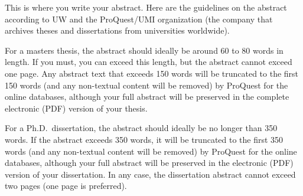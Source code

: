\documentclass[12pt]{book}                  %
\begin{document}

\thesisCommitteePage

\begin{thesisabstract}
This is where you write your abstract.  Here are the guidelines on
the abstract according to UW and the
ProQuest/UMI organization (the company that archives theses and dissertations from
universities worldwide).


For a masters thesis, the abstract should ideally be around 60 to 80
words in length.  If you must, you can exceed this length, but the
abstract cannot exceed one page.  Any abstract text that exceeds
150 words will be truncated to the first 150 words (and any non-textual content will
be removed) by ProQuest for the online databases, although your full abstract will
be preserved in the complete electronic (PDF) version of your thesis.


For a Ph.D.\ dissertation, the abstract should ideally be no longer than 350 words. If
the abstract exceeds 350 words, it will be truncated to the first 350 words (and any
non-textual content will be removed) by ProQuest for the online databases, although your
full abstract will be preserved in the electronic (PDF) version of your dissertation. In
any case, the dissertation abstract cannot exceed two pages (one page is preferred).



\end{thesisabstract}

 \thesistitlepage        %
 \thesiscopyrightpage    %

\end{document}
